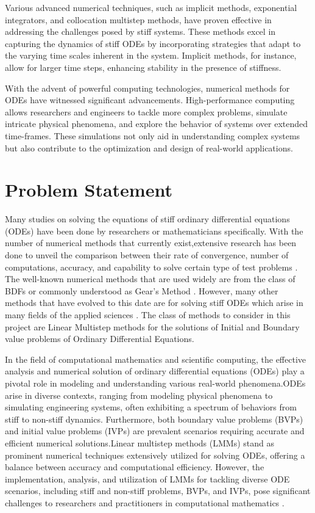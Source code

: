 Various advanced numerical techniques, such as implicit methods, exponential integrators, and collocation multistep methods, have proven effective in addressing the challenges posed by stiff systems. These methods excel in capturing the dynamics of stiff ODEs by incorporating strategies that adapt to the varying time scales inherent in the system. Implicit methods, for instance, allow for larger time steps, enhancing stability in the presence of stiffness.

With the advent of powerful computing technologies, numerical methods for ODEs have witnessed significant advancements. High-performance computing allows researchers and engineers to tackle more complex problems, simulate intricate physical phenomena, and explore the behavior of systems over extended time-frames. These simulations not only aid in understanding complex systems but also contribute to the optimization and design of real-world applications.

\section{Problem Statement}

Many studies on solving the equations of stiff ordinary differential equations (ODEs) have been done by researchers or mathematicians specifically. With the number of numerical methods that currently exist,extensive research has been done to unveil the comparison between their rate of convergence, number of computations, accuracy, and capability to solve certain type of test problems \cite{Enright1975} . The well-known numerical methods that are used widely are from the class of BDFs or commonly understood as Gear’s Method \cite{BYRNE1977125}. 
However, many other methods that have evolved to this date are for solving stiff ODEs which arise in many fields of the applied sciences \cite{Yatim2013}. The class of methods to consider in this project are Linear Multistep methods for the solutions of Initial and Boundary value problems of Ordinary Differential Equations.

In the field of computational mathematics and scientific computing, the effective analysis and numerical solution of ordinary differential equations (ODEs) play a pivotal role in modeling and understanding various real-world phenomena.ODEs arise in diverse contexts, ranging from modeling physical phenomena to simulating engineering systems, often exhibiting a spectrum of behaviors from stiff to non-stiff dynamics. Furthermore, both boundary value problems (BVPs) and initial value problems (IVPs) are prevalent scenarios requiring accurate and efficient numerical solutions.Linear multistep methods (LMMs) stand as prominent numerical techniques extensively utilized for solving ODEs, offering a balance between accuracy and computational efficiency. However, the implementation, analysis, and utilization of LMMs for tackling diverse ODE scenarios, including stiff and non-stiff problems, BVPs, and IVPs, pose significant challenges to researchers and practitioners in computational mathematics \cite{BUTCHER20091834}.

